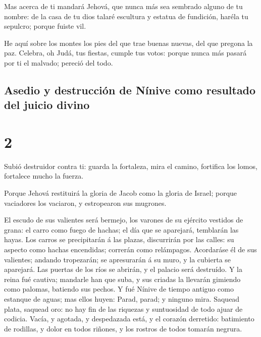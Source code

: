  Mas acerca de ti mandará Jehová, que nunca más sea
sembrado alguno de tu nombre: de la casa de tu dios talaré escultura y
estatua de fundición, haréla tu sepulcro; porque fuiste vil.

 He aquí sobre los montes los pies del que trae buenas
nuevas, del que pregona la paz. Celebra, oh Judá, tus fiestas, cumple
tus votos: porque nunca más pasará por ti el malvado; pereció del todo.

\hypertarget{asedio-y-destrucciuxf3n-de-nuxednive-como-resultado-del-juicio-divino}{%
\subsection{Asedio y destrucción de Nínive como resultado del juicio
divino}\label{asedio-y-destrucciuxf3n-de-nuxednive-como-resultado-del-juicio-divino}}

\hypertarget{section-1}{%
\section{2}\label{section-1}}

 Subió destruidor contra ti: guarda la fortaleza, mira el
camino, fortifica los lomos, fortalece mucho la fuerza.

 Porque Jehová restituirá la gloria de Jacob como la gloria
de Israel; porque vaciadores los vaciaron, y estropearon sus mugrones.

 El escudo de sus valientes será bermejo, los varones de su
ejército vestidos de grana: el carro como fuego de hachas; el día que se
aparejará, temblarán las hayas.  Los carros se precipitarán
á las plazas, discurrirán por las calles: su aspecto como hachas
encendidas; correrán como relámpagos.  Acordaráse él de sus
valientes; andando tropezarán; se apresurarán á su muro, y la cubierta
se aparejará.  Las puertas de los ríos se abrirán, y el
palacio será destruído.  Y la reina fué cautiva; mandarle
han que suba, y sus criadas la llevarán gimiendo como palomas, batiendo
sus pechos.  Y fué Nínive de tiempo antiguo como estanque de
aguas; mas ellos huyen: Parad, parad; y ninguno mira. 
Saquead plata, saquead oro: no hay fin de las riquezas y suntuosidad de
todo ajuar de codicia.  Vacía, y agotada, y despedazada
está, y el corazón derretido: batimiento de rodillas, y dolor en todos
riñones, y los rostros de todos tomarán negrura.

